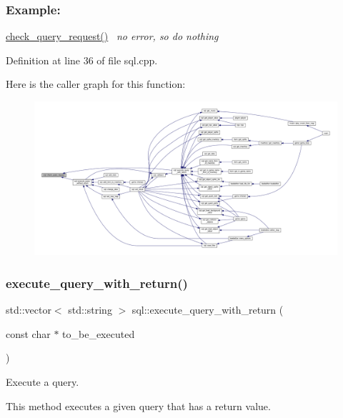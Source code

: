 \subsubsection*{Example\+: }

\hyperlink{classsql_a4bdab1846b3789ddd83521d5eec019b5}{check\+\_\+query\+\_\+request()}~\newline
{\itshape no error, so do nothing} 

Definition at line 36 of file sql.\+cpp.

Here is the caller graph for this function\+:
\nopagebreak
\begin{figure}[H]
\begin{center}
\leavevmode
\includegraphics[width=350pt]{classsql_a4bdab1846b3789ddd83521d5eec019b5_icgraph}
\end{center}
\end{figure}
\mbox{\label{classsql_a53dd323de395c13534e63a3482190777}} 
\subsubsection{\texorpdfstring{execute\+\_\+query\+\_\+with\+\_\+return()}{execute\_query\_with\_return()}}
{\footnotesize\ttfamily std\+::vector$<$ std\+::string $>$ sql\+::execute\+\_\+query\+\_\+with\+\_\+return (\begin{DoxyParamCaption}\item[{const char $\ast$}]{to\+\_\+be\+\_\+executed }\end{DoxyParamCaption})}



Execute a query. 

This method executes a given query that has a return value.~\newline
